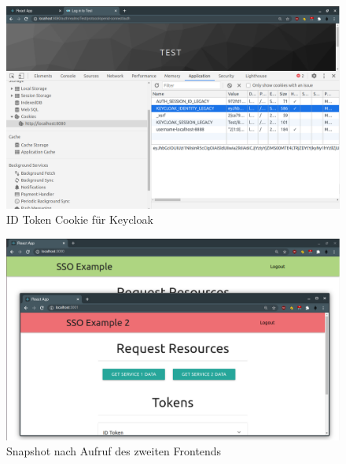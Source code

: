 \begin{figure}[!ht]
	\centering
	\includegraphics[width=1\textwidth]{Images/Ebert/FrontendCookieForKeycloak.PNG}
	\caption{ID Token Cookie für Keycloak}
	\label{fig:EB_ID Token Cookie für Keycloak}
\end{figure}

\begin{figure}[!ht]
	\centering
	\includegraphics[width=1\textwidth]{Images/Ebert/FrontendOpenSecondFrontend.PNG}
	\caption{Snapshot nach Aufruf des zweiten Frontends}
	\label{fig:EB_Snapshot nach Aufruf des zweiten Frontends}
\end{figure}



